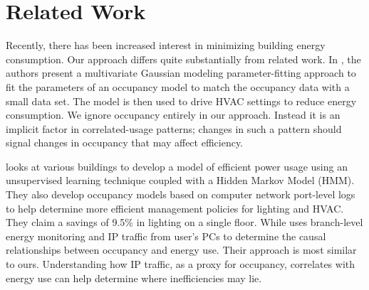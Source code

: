 \section{Related Work}
Recently, there has been increased interest in minimizing building energy consumption.  Our approach
differs quite substantially from related work.
In \cite{occmodels_buildsys11}, the authors present a multivariate Gaussian modeling parameter-fitting 
approach to fit the parameters of an occupancy model to match the occupancy data with a small data set.  
The model is then used to drive HVAC settings to reduce energy consumption.  We ignore occupancy entirely 
in our approach.  Instead it is an implicit factor in correlated-usage patterns; changes in such a pattern 
should signal changes in occupancy that may affect efficiency.


\cite{Bellala_buildsys11} looks at various buildings to develop a model of efficient power usage using 
an unsupervised learning technique coupled with a Hidden Markov Model (HMM).  They also develop occupancy models based on
computer network port-level logs to help determine more efficient management policies for lighting and HVAC.  
They claim a savings of 9.5\% in lighting on a single floor.  While 
\cite{kim:buildsys2010} uses branch-level energy monitoring and IP traffic from user's PCs to determine the
causal relationships between occupancy and energy use.  Their approach is most similar to ours.  Understanding how IP 
traffic, as a proxy for occupancy, correlates with energy use can help determine where inefficiencies may lie.



